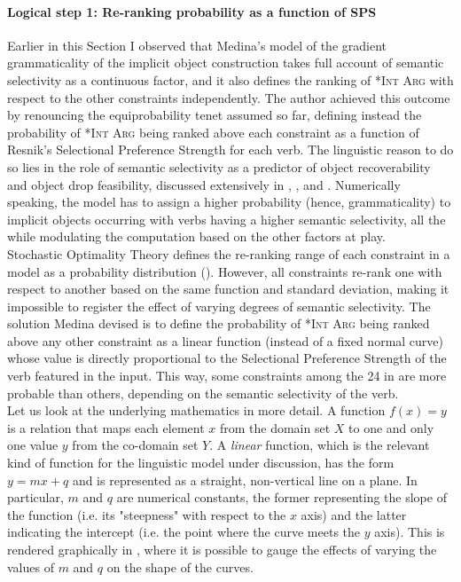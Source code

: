 \paragraph{Logical step 1: Re-ranking probability as a function of SPS} Earlier in this Section I observed that Medina's model of the gradient grammaticality of the implicit object construction takes full account of semantic selectivity as a continuous factor, and it also defines the ranking of \textsc{*Int Arg} with respect to the other constraints independently. The author achieved this outcome by renouncing the equiprobability tenet assumed so far, defining instead the probability of \textsc{*Int Arg} being ranked above each constraint as a function of Resnik's Selectional Preference Strength \parencite{Resnik1993,Resnik1996} for each verb. The linguistic reason to do so lies in the role of semantic selectivity as a predictor of object recoverability and object drop feasibility, discussed extensively in , , and . Numerically speaking, the model has to assign a higher probability (hence, grammaticality) to implicit objects occurring with verbs having a higher semantic selectivity, all the while modulating the computation based on the other factors at play.\\
Stochastic Optimality Theory defines the re-ranking range of each constraint in a model as a probability distribution (). However, all constraints re-rank one with respect to another based on the same function and standard deviation, making it impossible to register the effect of varying degrees of semantic selectivity. The solution Medina devised \parencite[94]{Medina2007} is to define the
probability of \textsc{*Int Arg} being ranked above any other constraint as a linear function (instead of a fixed normal curve) whose value is directly proportional to the Selectional Preference Strength of the verb featured in the input. This way, some constraints among the 24 in  are more probable than others, depending on the semantic selectivity of the verb.\\
Let us look at the underlying mathematics in more detail. A function $f(x) = y$ is a relation that maps each element $x$ from the domain set $X$ to one and only one value $y$ from the co-domain set $Y$. A \textit{linear} function, which is the relevant kind of function for the linguistic model under discussion, has the form $y = mx + q$ and is represented as a straight, non-vertical line on a plane. In particular, $m$ and $q$ are numerical constants, the former representing the slope of the function (i.e. its "steepness" with respect to the $x$ axis) and the latter indicating the intercept (i.e. the point where the curve meets the $y$ axis). This is rendered graphically in , where it is possible to gauge the effects of varying the values of $m$ and $q$ on the shape of the curves.

